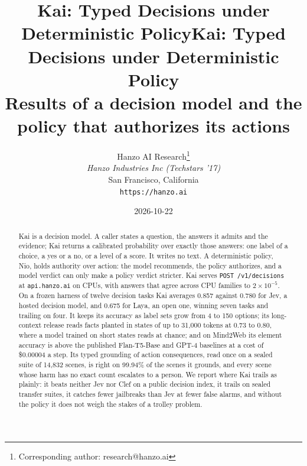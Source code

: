 \documentclass[11pt]{article}
\title{Kai: Typed Decisions under Deterministic Policy}
\author{
    Hanzo AI Research\thanks{Corresponding author: research@hanzo.ai} \\
    \textit{Hanzo Industries Inc (Techstars '17)} \\
    San Francisco, California \\
    \texttt{https://hanzo.ai}
}
\date{2026-10-22}
\newcommand{\op}[1]{\texttt{#1}}
\begin{document}
\hanzocoverpage
\title{Kai: Typed Decisions under Deterministic Policy\\[0.35em]
{\large Results of a decision model and the policy that authorizes its actions}}
\maketitle

\begin{abstract}
\noindent
Kai is a decision model. A caller states a question, the answers it admits and
the evidence; Kai returns a calibrated probability over exactly those answers:
one label of a choice, a yes or a no, or a level of a score. It writes no text.
A deterministic policy, Nio, holds authority over action: the model recommends,
the policy authorizes, and a model verdict can only make a policy verdict
stricter. Kai serves \op{POST /v1/decisions} at \texttt{api.hanzo.ai} on CPUs,
with answers that agree across CPU families to $2\times10^{-5}$. On a frozen
harness of twelve decision tasks Kai averages 0.857 against 0.780 for Jev, a
hosted decision model, and 0.675 for Laya, an open one, winning seven tasks and
trailing on four. It keeps its accuracy as label sets grow from 4 to 150
options; its long-context release reads facts planted in states of up to
31,000 tokens at 0.73 to 0.80, where a model trained on short states reads at
chance; and on Mind2Web its element accuracy is above the published
Flan-T5-Base and GPT-4 baselines at a cost of \$0.00004 a step. Its typed grounding of action consequences, read once on a
sealed suite of 14,832 scenes, is right on 99.94\% of the scenes it grounds,
and every scene whose harm has no exact count escalates to a person. We report
where Kai trails as plainly: it beats neither Jev nor Clef on a public decision
index, it trails on sealed transfer suites, it catches fewer jailbreaks than Jev
at fewer false alarms, and without the policy it does not weigh the stakes of a
trolley problem.
\end{abstract}

\tableofcontents
\newpage











\appendix

\end{document}
